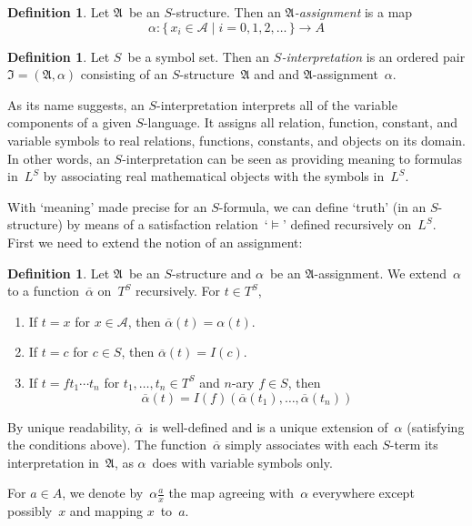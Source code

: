 \documentclass[letterpaper]{article}
\newcommand{\A}{\mathfrak{A}}
\newcommand{\I}{\mathfrak{I}}
\numberwithin{equation}{section}
\theoremstyle{plain}
\theoremstyle{definition}
\newtheorem{defn}[equation]{Definition}
\begin{document}
\begin{defn}
Let $\A$~be an $S$-structure. Then an \emph{$\A$-assignment} is a map
$$\alpha:\{\,x_i\in\mathcal{A}\mid i=0,1,2,\ldots\,\}\to A$$
\end{defn}
\begin{defn}
Let $S$~be a symbol set. Then an \emph{$S$-interpretation} is an ordered pair $\I=(\A,\alpha)$ consisting of an $S$-structure~$\A$ and and $\A$-assignment~$\alpha$.
\end{defn}
\noindent As its name suggests, an $S$-interpretation interprets all of the variable components of a given $S$-language. It assigns all relation, function, constant, and variable symbols to real relations, functions, constants, and objects on its domain. In other words, an $S$-interpretation can be seen as providing meaning to formulas in~$L^S$ by associating real mathematical objects with the symbols in~$L^S$.

With `meaning' made precise for an $S$-formula, we can define `truth' (in an $S$-structure) by means of a satisfaction relation~`$\models$' defined recursively on~$L^S$. First we need to extend the notion of an assignment:
\begin{defn}
Let $\A$~be an $S$-structure and $\alpha$~be an $\A$-assignment. We extend~$\alpha$ to a function~$\overline{\alpha}$ on~$T^S$ recursively. For $t\in T^S$,
\begin{enumerate}[itemsep=0pt]
\item If $t=x$ for $x\in\mathcal{A}$, then $\overline{\alpha}(t)=\alpha(t)$.
\item If $t=c$ for $c\in S$, then $\overline{\alpha}(t)=I(c)$.
\item If $t=ft_1\cdots t_n$ for $t_1,\ldots,t_n\in T^S$ and $n$-ary $f\in S$, then
$$\overline{\alpha}(t)=I(f)(\overline{\alpha}(t_1),\ldots,\overline{\alpha}(t_n))$$
\end{enumerate}
\end{defn}
\noindent By unique readability, $\overline{\alpha}$~is well-defined and is a unique extension of~$\alpha$ (satisfying the conditions above). The function~$\overline{\alpha}$ simply associates with each $S$-term its interpretation in~$\A$, as $\alpha$~does with variable symbols only.

For $a\in A$, we denote by~$\alpha\tfrac{a}{x}$ the map agreeing with~$\alpha$ everywhere except possibly~$x$ and mapping $x$~to~$a$.
\end{document}

